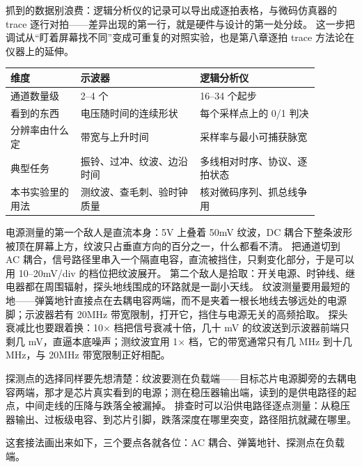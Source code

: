抓到的数据别浪费：逻辑分析仪的记录可以导出成逐拍表格，与微码仿真器的 trace 逐行对拍——差异出现的第一行，就是硬件与设计的第一处分歧。
这一步把调试从“盯着屏幕找不同”变成可重复的对照实验，也是第八章逐拍 trace 方法论在仪器上的延伸。

\begin{longtable}{L{0.20\linewidth}L{0.34\linewidth}L{0.34\linewidth}}
\toprule
维度 & 示波器 & 逻辑分析仪 \\
\midrule
通道数量级 & 2--4 个 & 16--34 个起步 \\
看到的东西 & 电压随时间的连续形状 & 每个采样点上的 0/1 判决 \\
分辨率由什么定 & 带宽与上升时间 & 采样率与最小可捕获脉宽 \\
典型任务 & 振铃、过冲、纹波、边沿时间 & 多线相对时序、协议、逐拍状态 \\
本书实验里的用法 & 测纹波、查毛刺、验时钟质量 & 核对微码序列、抓总线争用 \\
\bottomrule
\end{longtable}

电源测量的第一个敌人是直流本身：5V 上叠着 50mV 纹波，DC 耦合下整条波形被顶在屏幕上方，纹波只占垂直方向的百分之一，什么都看不清。
把通道切到 AC 耦合，信号路径里串入一个隔直电容，直流被挡住，只剩变化部分，于是可以用 10--20mV/div 的档位把纹波展开。
第二个敌人是拾取：开关电源、时钟线、继电器都在周围辐射，探头地线围成的环路就是一副小天线。
纹波测量要用最短的地——弹簧地针直接点在去耦电容两端，而不是夹着一根长地线去够远处的电源脚；示波器若有 20MHz 带宽限制，打开它，挡住与电源无关的高频拾取。
探头衰减比也要跟着换：10$\times$ 档把信号衰减十倍，几十 mV 的纹波送到示波器前端只剩几 mV，直逼本底噪声；测纹波宜用 1$\times$ 档，它的带宽通常只有几 MHz 到十几 MHz，与 20MHz 带宽限制正好相配。

探测点的选择同样要先想清楚：纹波要测在负载端——目标芯片电源脚旁的去耦电容两端，那才是芯片真实看到的电源；测在稳压器输出端，读到的是供电路径的起点，中间走线的压降与跌落全被漏掉。
排查时可以沿供电路径逐点测量：从稳压器输出、过板级电容、到芯片引脚，跌落深度在哪里突变，路径阻抗就藏在哪里。

这套接法画出来如下，三个要点各就各位：AC 耦合、弹簧地针、探测点在负载端。


